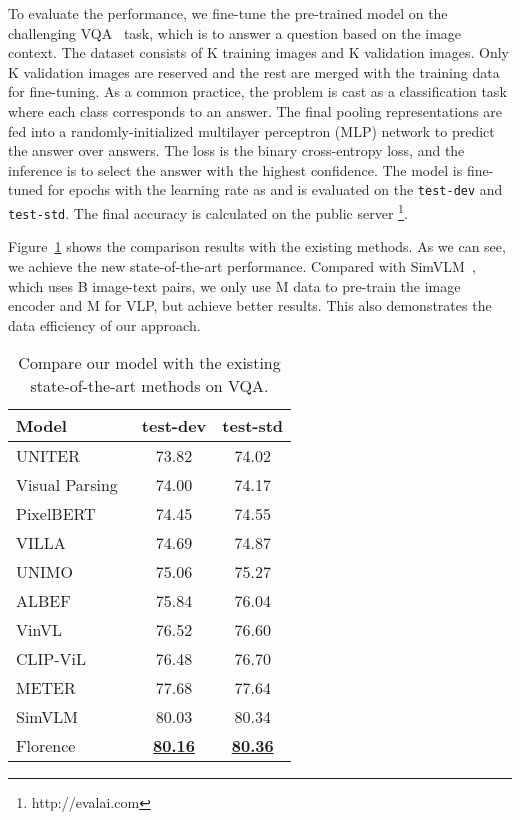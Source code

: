 \documentclass{article}
\begin{document}
To evaluate the performance, we fine-tune the pre-trained model on the
challenging VQA~\cite{GoyalKSBP16} task, which is
to answer a question based on the image context.
The dataset consists of K training images and K validation images.
Only K validation images are reserved and the rest are merged with
the training data for fine-tuning.
As a common practice, the problem is cast as a classification task
where each class corresponds to an answer.
The final pooling representations
are fed into a
randomly-initialized multilayer perceptron (MLP) network to predict the answer
over  answers.
The loss is the binary cross-entropy loss, and the inference is to select the answer with the
highest confidence.
The model is fine-tuned for  epochs with the learning rate as  and is evaluated
on the \texttt{test-dev} and \texttt{test-std}. The final accuracy is calculated on
the public server \footnote{http://evalai.com}.

Figure~\ref{tab:vqa} shows the comparison results with the existing methods.
As we can see, we achieve the new state-of-the-art performance.
Compared with SimVLM~\cite{wang2021simvlm}, which uses B image-text pairs,
we only use M data to pre-train the image encoder and M
for VLP, but achieve better results.
This also demonstrates the data efficiency of our approach.


\begin{table}[t]
\centering
\setlength{\tabcolsep}{10.5pt}
\small
\renewcommand{\arraystretch}{1.35}
\begin{tabular}{l|cc}
\toprule
    Model                                 & test-dev            & test-std \\ \midrule
    UNITER~\cite{chen:uniter}           & 73.82               & 74.02 \\
    Visual Parsing~\cite{xue2021probing}  & 74.00               & 74.17 \\
    PixelBERT~\cite{huang2020pixel}       & 74.45               & 74.55 \\
    VILLA~\cite{gan:villa}             & 74.69               & 74.87 \\
    UNIMO~\cite{li2020unimo}              & 75.06               & 75.27 \\
    ALBEF~\cite{li2021align}              & 75.84               & 76.04 \\
    VinVL~\cite{Zhang_2021_CVPR}           & 76.52               & 76.60 \\
    CLIP-ViL~\cite{shen2021much}          & 76.48               & 76.70 \\
    METER~\cite{dou2021empirical}         & 77.68               & 77.64 \\
    SimVLM~\cite{wang2021simvlm}          & 80.03               & 80.34 \\
    \midrule
    Florence                            & \underline{\bf{80.16}}      & \underline{\bf{80.36}} \\
    \bottomrule
\end{tabular}
\caption{Compare our model with the existing state-of-the-art methods on VQA.}
  \label{tab:vqa}
\end{table}
\end{document}

